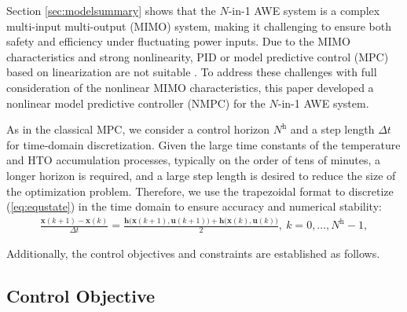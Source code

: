 \documentclass[review,3p,10pt]{elsarticle}
\begin{document}
Section \ref{sec:modelsummary} shows that the $N$-in-1 AWE system is a complex multi-input multi-output (MIMO) system, making it challenging to ensure both safety and efficiency under fluctuating power inputs. %
Due to the MIMO characteristics and strong nonlinearity, %
PID \cite{qi2023design,qi2021pressure} or model predictive control (MPC) based on linearization are not suitable \cite{baldea2014integrated}. To address these challenges with full consideration of the nonlinear MIMO characteristics, this paper developed a nonlinear model predictive controller (NMPC) %
for the $N$-in-1 AWE system. %

As in the classical MPC, we consider a control horizon $N^\text{h}$ and a step length $\Delta t$ for time-domain discretization. Given the large time constants of the temperature and HTO accumulation processes, typically on the order of tens of minutes, a longer horizon is required, and a large step length is desired to reduce the size of the optimization problem. %
Therefore, we use the trapezoidal format to discretize (\ref{eq:equstate}) in the time domain to ensure accuracy and numerical stability:
\begin{align}
  \frac{\bm{x}(k+1) - \bm{x}(k) }{\Delta t} = \frac{\bm{h}\big( \bm{x}(k+1), \bm{u}(k+1) \big) + \bm{h}\big( \bm{x}(k), \bm{u}(k) \big)}{2}, \ k = 0, \ldots, N^{\text{h}}-1, \label{eq:diststate}
\end{align}

Additionally, the control objectives and constraints are established as follows.

\subsection{Control Objective}
\label{sec:obj}
\end{document}

